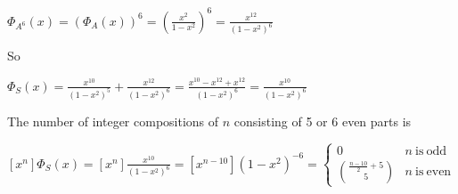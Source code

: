 \begin{enumerate}
\begin{center}
        $\Phi_{A^6}(x) = (\Phi_{A}(x))^6 = (\frac{x^2}{1-x^2})^6 =  \frac{x^{12}}{(1-x^2)^6}$
    \end{center}

    So \begin{center}
        $\Phi_S(x) = \frac{x^{10}}{(1-x^2)^5} + \frac{x^{12}}{(1-x^2)^6} = \frac{x^{10} - x^{12} + x^{12}}{(1-x^2)^6} = \frac{x^{10}}{(1-x^2)^6}$
    \end{center}

    The number of integer compositions of $n$ consisting of 5 or 6 even parts is 

    \begin{center}
        $[x^n]\Phi_S(x) = [x^n]\frac{x^{10}}{(1-x^2)^6} = [x^{n-10}](1-x^2)^{-6} =  \begin{cases} 
          0 & n\ \mathrm{is}\ \mathrm{odd} \\
          {\frac{n-10}{2} + 5 \choose 5} & n\ \mathrm{is}\ \mathrm{even} 
       \end{cases}$
    \end{center}

    
    
\end{enumerate}


